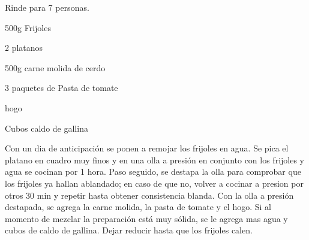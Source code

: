 
Rinde para 7 personas.

\begin{ingredientes}
\item 500g Frijoles
\item 2 platanos
\item 500g carne molida de cerdo
\item 3 paquetes de Pasta de tomate
\item hogo
\item Cubos caldo de gallina
\end{ingredientes}
\preparacion
Con un dia de anticipación se ponen a remojar los frijoles en agua. Se pica el platano en cuadro muy finos y en una olla a presión en conjunto con los frijoles y agua se cocinan por 1 hora. Paso seguido, se destapa la olla para comprobar que los frijoles ya hallan ablandado; en caso de que no, volver a cocinar a presion por otros 30 min y repetir hasta obtener consistencia blanda. Con la olla a presión destapada, se agrega la carne molida, la pasta de tomate y el hogo. Si al momento de mezclar la preparación está muy sólida, se le agrega mas agua y cubos de caldo de gallina. Dejar reducir hasta que los frijoles calen.
